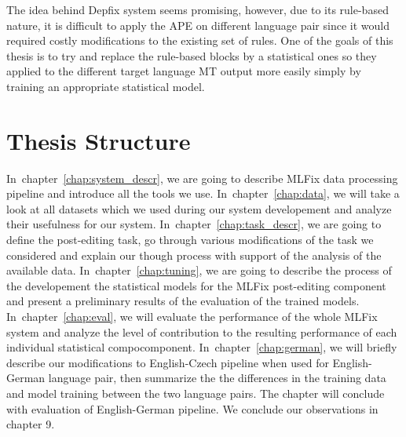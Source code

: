 The idea behind Depfix system seems promising, however, due to its rule-based nature, it is difficult
to apply the APE on different language pair since it would required costly modifications to the
existing set of rules. One of the goals of this thesis is to try and replace the rule-based blocks
by a statistical ones so they applied to the different target language MT output more easily simply
by training an appropriate statistical model.


\section{Thesis Structure}

In~chapter~\ref{chap:system_descr}, we are going to describe MLFix data processing
pipeline and introduce all the tools we use.
In~chapter~\ref{chap:data}, we will take a look at all datasets which we used during our system
developement and analyze their usefulness for our system.
In~chapter~\ref{chap:task_descr}, we are going to define the post-editing task, go through
various modifications of the task we considered and explain our though
process with support of the analysis of the available data.
In~chapter~\ref{chap:tuning}, we are going to describe the process of the developement
the statistical models for the MLFix post-editing component and present
a preliminary results of the evaluation of the trained models.
In~chapter~\ref{chap:eval}, we will evaluate the performance of the whole MLFix system
and analyze the level of contribution to the resulting performance
of each individual statistical compocomponent.
In~chapter~\ref{chap:german}, we will briefly describe our modifications to English-Czech pipeline
when used for English-German language pair, then summarize the the differences
in the training data and model training between the two language pairs. The chapter will
conclude with evaluation of English-German pipeline.
We conclude our observations in chapter 9.

